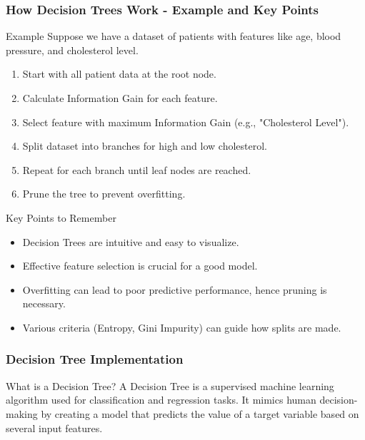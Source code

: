 \documentclass[aspectratio=169]{beamer}
\begin{document}
\begin{frame}[fragile]
    \frametitle{How Decision Trees Work - Example and Key Points}
    \begin{block}{Example}
        Suppose we have a dataset of patients with features like age, blood pressure, and cholesterol level.
        \begin{enumerate}
            \item Start with all patient data at the root node.
            \item Calculate Information Gain for each feature.
            \item Select feature with maximum Information Gain (e.g., "Cholesterol Level").
            \item Split dataset into branches for high and low cholesterol.
            \item Repeat for each branch until leaf nodes are reached.
            \item Prune the tree to prevent overfitting.
        \end{enumerate}
    \end{block}

    \begin{block}{Key Points to Remember}
        \begin{itemize}
            \item Decision Trees are intuitive and easy to visualize.
            \item Effective feature selection is crucial for a good model.
            \item Overfitting can lead to poor predictive performance, hence pruning is necessary.
            \item Various criteria (Entropy, Gini Impurity) can guide how splits are made.
        \end{itemize}
    \end{block}
\end{frame}

\begin{frame}
    \frametitle{Decision Tree Implementation}
    \begin{block}{What is a Decision Tree?}
        A Decision Tree is a supervised machine learning algorithm used for classification and regression tasks. 
        It mimics human decision-making by creating a model that predicts the value of a target variable based on several input features.
    \end{block}
\end{frame}
\end{document}
